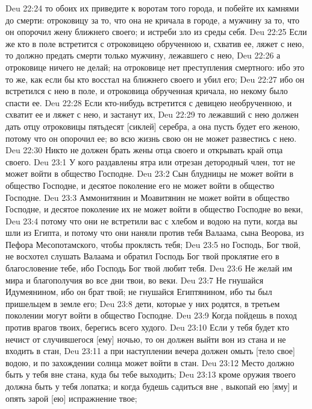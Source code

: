 \vs Deu 22:24 то обоих их приведите к воротам того города, и побейте их камнями до смерти: отроковицу за то, что она не кричала в городе, а мужчину за то, что он опорочил жену ближнего своего; и  истреби зло из среды себя.
\vs Deu 22:25 Если же кто в поле встретится с отроковицею обрученною и, схватив ее, ляжет с нею, то должно предать смерти только мужчину, лежавшего с нею,
\vs Deu 22:26 а отроковице ничего не делай; на отроковице нет преступления смертного: ибо это то же, как если бы кто восстал на ближнего своего и убил его;
\vs Deu 22:27 ибо он встретился с нею в поле, и  отроковица обрученная кричала, но некому было спасти ее.
\vs Deu 22:28 Если кто-нибудь встретится с девицею необрученною, и схватит ее и ляжет с нею, и застанут их,
\vs Deu 22:29 то лежавший с нею должен дать отцу отроковицы пятьдесят [сиклей] серебра, а она пусть будет его женою, потому что он опорочил ее; во всю жизнь свою он не может развестись с нею.
\rsbpar\vs Deu 22:30 Никто не должен брать жены отца своего и открывать край  отца своего.
\vs Deu 23:1 У кого раздавлены ятра или отрезан детородный член, тот не может войти в общество Господне.
\vs Deu 23:2 Сын блудницы не может войти в общество Господне, и десятое поколение его не может войти в общество Господне.
\vs Deu 23:3 Аммонитянин и Моавитянин не может войти в общество Господне, и десятое поколение их не может войти в общество Господне во веки,
\vs Deu 23:4 потому что они не встретили вас с хлебом и водою на пути, когда вы шли из Египта, и потому что они наняли против тебя Валаама, сына Веорова, из Пефора Месопотамского, чтобы проклясть тебя;
\vs Deu 23:5 но Господь, Бог твой, не восхотел слушать Валаама и обратил Господь Бог твой проклятие его в благословение тебе, ибо Господь Бог твой любит тебя.
\vs Deu 23:6 Не желай им мира и благополучия во все дни твои, во веки.
\vs Deu 23:7 Не гнушайся Идумеянином, ибо он брат твой; не гнушайся Египтянином, ибо ты был пришельцем в земле его;
\vs Deu 23:8 дети, которые у них родятся, в третьем поколении могут войти в общество Господне.
\rsbpar\vs Deu 23:9 Когда пойдешь в поход против врагов твоих, берегись всего худого.
\vs Deu 23:10 Если у тебя будет кто нечист от случившегося [ему] ночью, то он должен выйти вон из стана и не входить в стан,
\vs Deu 23:11 а при наступлении вечера должен омыть [тело свое] водою, и по захождении солнца может войти в стан.
\vs Deu 23:12 Место должно быть у тебя вне стана, куда бы тебе выходить;
\vs Deu 23:13 кроме оружия твоего должна быть у тебя лопатка; и когда будешь садиться вне , выкопай ею [яму] и опять зарой [ею] испражнение твое;
